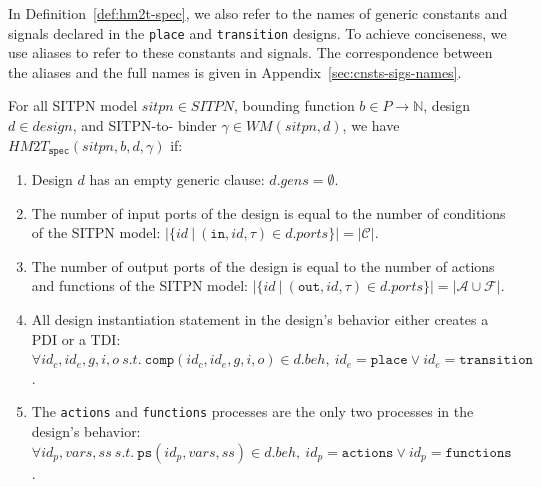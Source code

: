 \bigskip

In Definition~\ref{def:hm2t-spec}, we also refer to the names of
generic constants and signals declared in the \texttt{place} and
\texttt{transition} designs. To achieve conciseness, we use aliases to
refer to these constants and signals. The correspondence between the
aliases and the full names is given in
Appendix~\ref{sec:cnsts-sigs-names}.


\def\pdiInBeh{\mathtt{comp}(\gamma(p),\mathtt{place},g_p,i_p,o_p)\in{}d.beh}
\def\tdiInBeh{\mathtt{comp}(\gamma(t),\mathtt{transition},g_t,i_t,o_t)\in{}d.beh}
\def\tdiInBehP#1{\mathtt{comp}(\gamma(#1),\mathtt{transition},g_{#1},i_{#1},o_{#1})\in{}d.beh}

\begin{definition}
  \label{def:hm2t-spec}
  For all SITPN model $sitpn\in{}SITPN$, bounding function
  $b\in{}P\rightarrow\mathbb{N}$, \hvhdl{} design $d\in{}design$, and
  SITPN-to-\hvhdl{} binder $\gamma\in{}WM(sitpn,d)$, we have
  $HM2T_{\mathtt{spec}}(sitpn,b,d,\gamma)$ if:
  
  \begin{enumerate}
  \item\label{it:emp-gen-clause} Design $d$ has an empty generic clause: $d.gens=\emptyset$.

  \item The number of input ports of the design is equal to the number
    of conditions of the SITPN model:
    $\vert\{id~\vert~(\mathtt{in},id,\tau)\in{}d.ports\}\vert=\vert\mathcal{C}\vert$.
  \item The number of output ports of the design is equal to the
    number of actions and functions of the SITPN model:
    $\vert\{id~\vert~(\mathtt{out},id,\tau)\in{}d.ports\}\vert=\vert\mathcal{A}\cup{}\mathcal{F}\vert$.

  \item\label{it:pdi-tdi-only} All design instantiation statement in
    the design's behavior
    either creates a PDI or a TDI: \\
    $\forall{}id_c,id_e,g,i,o~s.t.~\mathtt{comp}(id_c,id_e,g,i,o)\in{}d.beh,~id_e=\mathtt{place}\lor{}id_e=\mathtt{transition}$.
    
  \item\label{it:actions-functions-only} The \texttt{actions} and
    \texttt{functions} processes are the
    only two processes in the design's behavior:\\
    $\forall{}id_p,vars,ss~s.t.~\mathtt{ps}(id_p,vars,ss)\in{}d.beh,~id_p=\mathtt{actions}\lor{}id_p=\mathtt{functions}$.
    

\end{enumerate}
\end{definition}

